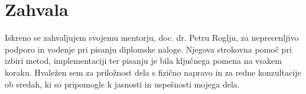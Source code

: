 \documentclass[12pt,a4paper,titlepage,openany]{report}
\begin{document}
\medskip

\begin{center}
\end{center}





\newpage
\section*{Zahvala}
Iskreno se zahvaljujem svojemu mentorju, doc. dr. Petru Roglju, za neprecenljivo podporo in vodenje pri pisanju diplomske naloge. Njegova strokovna pomoč pri izbiri metod, implementaciji ter pisanju je bila ključnega pomena na vsakem koraku. Hvaležen sem za priložnost dela s fizično napravo in za redne konzultacije ob sredah, ki so pripomogle k jasnosti in uspešnosti mojega dela.
\end{document}
